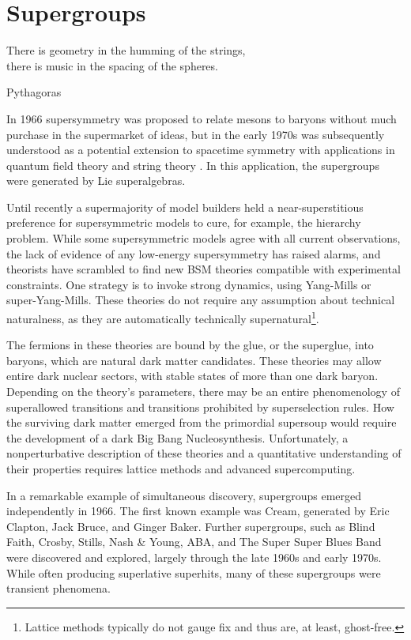 \section{Supergroups}

\epigraph{There is geometry in the humming of the strings,\\
there is music in the spacing of the spheres.}{Pythagoras}


In 1966 supersymmetry was proposed to relate mesons to baryons\cite{doi:10.1143/PTP.36.1266} without much purchase in the supermarket of ideas, but in the early 1970s was subsequently understood as a potential extension to spacetime symmetry with applications in quantum field theory and string theory \cite{Gervais:1971ji,Ramond:1971gb,Volkov:1973ix,Wess:1974tw}.
In this application, the supergroups were generated by Lie superalgebras.

Until recently a supermajority of model builders held a near-superstitious preference for supersymmetric models to cure, for example, the hierarchy problem.
While some supersymmetric models agree with all current observations\cite{fox:2005}, the lack of evidence of any low-energy supersymmetry has raised alarms, and theorists have scrambled to find new BSM theories compatible with experimental constraints.
One strategy is to invoke strong dynamics, using Yang-Mills or super-Yang-Mills.
These theories do not require any assumption about technical naturalness, as they are automatically technically supernatural\footnote{Lattice methods typically do not gauge fix and thus are, at least, ghost-free.}.

The fermions in these theories are bound by the glue, or the superglue, into baryons, which are natural dark matter candidates.
These theories may allow entire dark nuclear sectors, with stable states of more than one dark baryon.
Depending on the theory's parameters, there may be an entire phenomenology of superallowed transitions and transitions prohibited by superselection rules.
How the surviving dark matter emerged from the primordial supersoup would require the development of a dark Big Bang Nucleosynthesis.
Unfortunately, a nonperturbative description of these theories and a quantitative understanding of their properties requires lattice methods and advanced supercomputing\cite{Detmold:2014qqa,Detmold:2014kba}.

In a remarkable example of simultaneous discovery, supergroups emerged independently in 1966.
The first known example was Cream, generated by Eric Clapton, Jack Bruce, and Ginger Baker\cite{supergroups}.
Further supergroups, such as Blind Faith, Crosby, Stills, Nash \& Young, ABA, and The Super Super Blues Band\cite{supersuperblues} were discovered and explored, largely through the late 1960s and early 1970s.
While often producing superlative superhits, many of these supergroups were transient phenomena.
